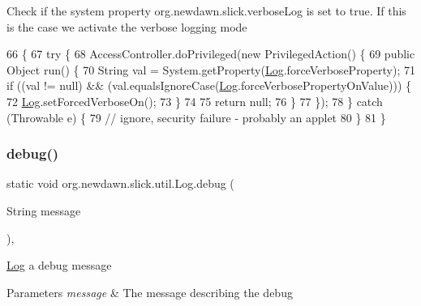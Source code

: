 Check if the system property org.\+newdawn.\+slick.\+verbose\+Log is set to true. If this is the case we activate the verbose logging mode 
\begin{DoxyCode}
66                                                 \{
67         \textcolor{keywordflow}{try} \{
68             AccessController.doPrivileged(\textcolor{keyword}{new} PrivilegedAction() \{
69                 \textcolor{keyword}{public} Object run() \{
70                     String val = System.getProperty(\mbox{\hyperlink{classorg_1_1newdawn_1_1slick_1_1util_1_1_log_a12b5743a88444ce86c46aa807fd0d0e9}{Log}}.forceVerboseProperty);
71                     \textcolor{keywordflow}{if} ((val != null) && (val.equalsIgnoreCase(\mbox{\hyperlink{classorg_1_1newdawn_1_1slick_1_1util_1_1_log_a12b5743a88444ce86c46aa807fd0d0e9}{Log}}.forceVerbosePropertyOnValue))) \{
72                         \mbox{\hyperlink{classorg_1_1newdawn_1_1slick_1_1util_1_1_log_a12b5743a88444ce86c46aa807fd0d0e9}{Log}}.setForcedVerboseOn();
73                     \}
74                     
75                     \textcolor{keywordflow}{return} null;
76                 \}
77             \});
78         \} \textcolor{keywordflow}{catch} (Throwable e) \{
79             \textcolor{comment}{// ignore, security failure - probably an applet}
80         \}
81     \}
\end{DoxyCode}
\mbox{\label{classorg_1_1newdawn_1_1slick_1_1util_1_1_log_a495951d927703781889c7bc55dfc8a5d}} 
\subsubsection{\texorpdfstring{debug()}{debug()}}
{\footnotesize\ttfamily static void org.\+newdawn.\+slick.\+util.\+Log.\+debug (\begin{DoxyParamCaption}\item[{String}]{message }\end{DoxyParamCaption})\hspace{0.3cm}{\ttfamily [inline]}, {\ttfamily [static]}}

\mbox{\hyperlink{classorg_1_1newdawn_1_1slick_1_1util_1_1_log}{Log}} a debug message


\begin{DoxyParams}{Parameters}
{\em message} & The message describing the debug \\
\hline
\end{DoxyParams}

